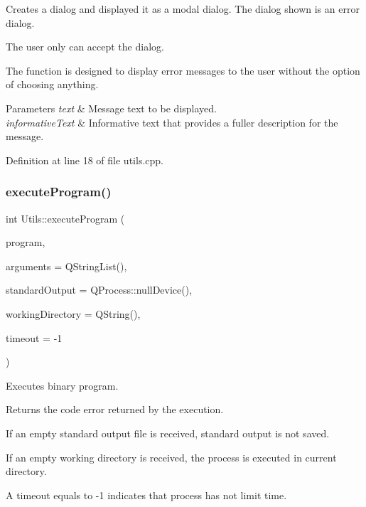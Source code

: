 Creates a dialog and displayed it as a modal dialog. The dialog shown is an error dialog. 

The user only can accept the dialog.

The function is designed to display error messages to the user without the option of choosing anything. 
\begin{DoxyParams}{Parameters}
{\em text} & Message text to be displayed. \\
\hline
{\em informative\+Text} & Informative text that provides a fuller description for the message. \\
\hline
\end{DoxyParams}


Definition at line 18 of file utils.\+cpp.

\mbox{\label{classUtils_a0ba873605d1b72ee448c18507d898d21}} 
\subsubsection{\texorpdfstring{execute\+Program()}{executeProgram()}}
{\footnotesize\ttfamily int Utils\+::execute\+Program (\begin{DoxyParamCaption}\item[{const Q\+String \&}]{program,  }\item[{const Q\+String\+List \&}]{arguments = {\ttfamily QStringList()},  }\item[{const Q\+String \&}]{standard\+Output = {\ttfamily QProcess\+:\+:nullDevice()},  }\item[{const Q\+String \&}]{working\+Directory = {\ttfamily QString()},  }\item[{const int}]{timeout = {\ttfamily -\/1} }\end{DoxyParamCaption})\hspace{0.3cm}{\ttfamily [static]}}



Executes binary program. 

Returns the code error returned by the execution.

If an empty standard output file is received, standard output is not saved.

If an empty working directory is received, the process is executed in current directory.

A timeout equals to -\/1 indicates that process has not limit time.

